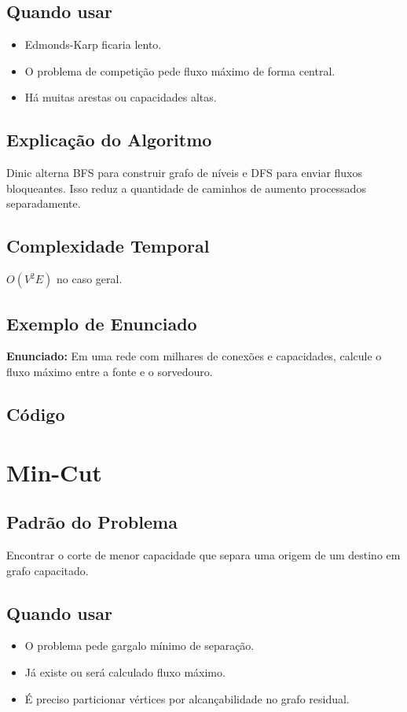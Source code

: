 \subsection{Quando usar}
\begin{itemize}[nosep]
  \item Edmonds-Karp ficaria lento.
  \item O problema de competição pede fluxo máximo de forma central.
  \item Há muitas arestas ou capacidades altas.
\end{itemize}

\subsection{Explicação do Algoritmo}
Dinic alterna BFS para construir grafo de níveis e DFS para enviar fluxos bloqueantes. Isso reduz a quantidade de caminhos de aumento processados separadamente.

\subsection{Complexidade Temporal}
$O(V^2E)$ no caso geral.

\subsection{Exemplo de Enunciado}
\begin{exemplodiabox}
\textbf{Enunciado:} Em uma rede com milhares de conexões e capacidades, calcule o fluxo máximo entre a fonte e o sorvedouro.
\end{exemplodiabox}

\subsection{Código}

\section{Min-Cut}

\subsection{Padrão do Problema}
Encontrar o corte de menor capacidade que separa uma origem de um destino em grafo capacitado.

\subsection{Quando usar}
\begin{itemize}[nosep]
  \item O problema pede gargalo mínimo de separação.
  \item Já existe ou será calculado fluxo máximo.
  \item É preciso particionar vértices por alcançabilidade no grafo residual.
\end{itemize}

